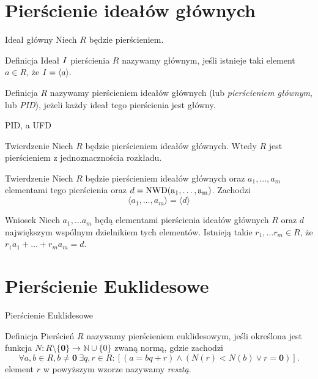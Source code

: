 \documentclass{beamer}
\newcommand{\zero}{\mathbf{0}}
\newcommand{\II}{\mathnormal{I}}
\newcommand{\NWD}{\rm{NWD}}
\begin{document}
\section{Pierścienie ideałów głównych}
\begin{frame}{Ideał główny}
    Niech $R$ będzie pierścieniem.
    \begin{block}{Definicja}
        Ideał $\II$ pierścienia $R$ nazywamy \alert{głównym}, jeśli istnieje taki element $a \in R$, że $\II = \langle a \rangle.$
    \end{block}
    \pause 
    \begin{block}{Definicja}
        $R$ nazywamy \alert{pierścieniem ideałów głównych} (lub \textit{pierścieniem głównym}, lub \textit{PID}), jeżeli każdy ideał tego pierścienia jest główny. 
    \end{block}
\end{frame}

\begin{frame}{PID, a UFD}
    \begin{block}{Twierdzenie}
        Niech $R$ będzie pierścieniem ideałów głównych. Wtedy $R$ jest pierścieniem z jednoznacznościa rozkładu.        
    \end{block}
    \pause 
    \begin{block}{Twierdzenie}
        Niech $R$ będzie pierścieniem ideałów głównych oraz $a_1, \ldots , a_m$ elementami tego pierścienia oraz $d = \NWD(a_1, \ldots , a_m)$. Zachodzi 
        $$\langle a_1 , \ldots , a_m \rangle = \langle d \rangle $$
    \end{block}
    \pause 
    \begin{alertblock}{Wniosek}
        Niech $a_1, \ldots a_m$ będą elementami pierścienia ideałów głównych $R$ oraz $d$ największym wspólnym dzielnikiem tych elementów. Istnieją takie $r_1, \ldots r_m \in R$, że 
        $r_1 a_1 + \ldots + r_m a_m = d$.
    \end{alertblock}
\end{frame}

\section{Pierścienie Euklidesowe}
\begin{frame}{Pierścienie Euklidesowe}
    \begin{block}{Definicja}
        Pierścień $R$ nazywamy \alert{pierścieniem euklidesowym}, jeśli określona jest funkcja $N: R\setminus \{ \zero\} \rightarrow \mathbb{N} \cup \{0\}$ zwaną normą, gdzie zachodzi 
        $$ \forall a,b \in R, b \neq \zero  \ \exists q,r \in R : [(a = bq + r) \land (N(r) < N(b) \lor r = \zero)].$$
        element $r$ w powyższym wzorze nazywamy \textit{resztą}.
    \end{block}
\end{frame}
\end{document}
